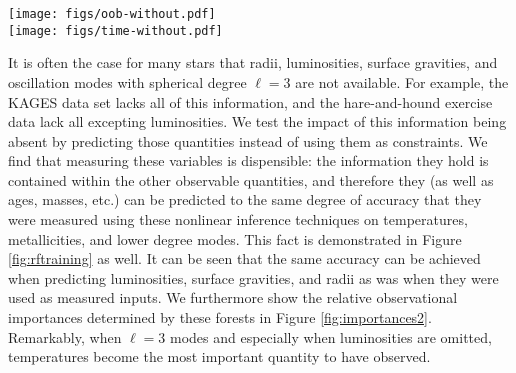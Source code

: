 \documentclass[manuscript]{aastex}
\begin{document}
\begin{figure*}
    \centering
    \texttt{[image: figs/oob-without.pdf]}\\
    \texttt{[image: figs/time-without.pdf]}\\
    \caption{Training accuracies (top) and times (bottom) of a random forest regressor plotted as a function of the number of trees in the forest. In less than one minute's time and using only a small number of trees, a machine learning algorithm can determine the relations that permit inference of stellar parameters from observations. It can also be seen that the training time is linear in the amount of decision trees used to fit the data. After the forest has about 16 trees, a regressor using a limited set of information (blue and red) does just as well as the regressor using all of the information (black). The performance of the regressor does not improve much after having grown about 32 trees. }
    \label{fig:rftraining}
\end{figure*}

It is often the case for many stars that radii, luminosities, surface gravities, and oscillation modes with spherical degree $\ell=3$ are not available. For example, the KAGES data set lacks all of this information, and the hare-and-hound exercise data lack all excepting luminosities. We test the impact of this information being absent by predicting those quantities instead of using them as constraints. We find that measuring these variables is dispensible: the information they hold is contained within the other observable quantities, and therefore they (as well as ages, masses, etc.) can be predicted to the same degree of accuracy that they were measured using these nonlinear inference techniques on temperatures, metallicities, and lower degree modes. This fact is demonstrated in Figure \ref{fig:rftraining} as well. It can be seen that the same accuracy can be achieved when predicting luminosities, surface gravities, and radii as was when they were used as measured inputs. We furthermore show the relative observational importances determined by these forests in Figure \ref{fig:importances2}. Remarkably, when $\ell=3$ modes and especially when luminosities are omitted, temperatures become the most important quantity to have observed. 
\end{document}
